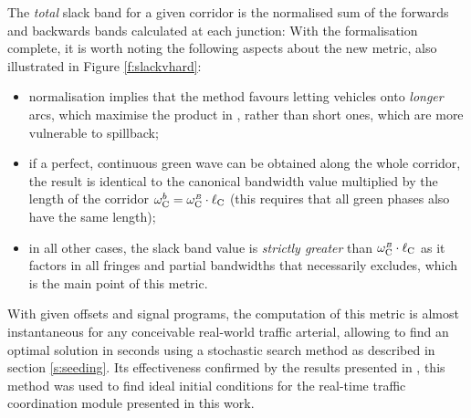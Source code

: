 The \emph{total} slack band for a given corridor is the normalised sum of the forwards and backwards bands calculated at each junction:
With the formalisation complete, it is worth noting the following aspects about the new metric, also illustrated in Figure \ref{f:slackvhard}:
\begin{itemize}
\item normalisation implies that the method favours letting vehicles onto \emph{longer} arcs, which maximise the product in , rather than short ones, which are more vulnerable to spillback;
\item if a perfect, continuous green wave can be obtained along the whole corridor, the result is identical to the canonical bandwidth value multiplied by the length of the corridor 
$\omega_{\mathrm{C}}^{\scriptstyle{b}} = \omega_{\mathrm{C}}^{\scriptscriptstyle{B}} \cdot \ell_{\mathrm{C}}$ (this requires that all green phases also have the same length);
\item in all other cases, the slack band value is \emph{strictly greater} than 
$\omega_{\mathrm{C}}^{\scriptscriptstyle{B}} \cdot \ell_{\mathrm{C}}$ as it factors in all fringes and partial bandwidths that  necessarily excludes, which is the main point of this metric.
\end{itemize}


With given offsets and signal programs, the computation of this metric is almost instantaneous for any conceivable real-world traffic arterial, allowing to find an optimal solution in seconds using a stochastic search method as described in section \ref{s:seeding}. Its effectiveness confirmed by the results presented in , this method was used to find ideal initial conditions for the real-time traffic coordination module presented in this work.